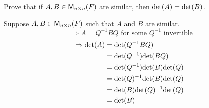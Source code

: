 Prove that if $A,B \in \mathsf{M}_{n \times n}(F)$ are similar, then
$\text{det}({A})=\text{det}({B})$.

Suppose $A,B \in \mathsf{M}_{n \times n}(F)$ such that $A$ and $B$ are similar.
\begin{equation}
\implies A = Q^{-1}BQ\text{ for some } Q^{-1} \text{ invertible}
\end{equation}
\begin{align}
\Rightarrow \text{det}({A}) &= \text{det}({Q^{-1}BQ})\\
&= \text{det}({Q^{-1}})\text{det}({BQ})\\
&= \text{det}({Q^{-1}})\text{det}({B})\text{det}({Q})\\
&= \text{det}({Q})^{-1}\text{det}({B})\text{det}({Q})\\
&= \text{det}({B})\text{det}({Q})^{-1}\text{det}({Q})\\
&= \text{det}({B})
\end{align}
